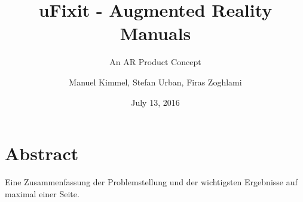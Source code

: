 \documentclass[doctype=Studienarbeit,oneside]{ldvbook}
\begin{document}
\subject{Advanced Seminar}
\title{uFixit - Augmented Reality Manuals}
\subtitle{An AR Product Concept}
\author{Manuel Kimmel, Stefan Urban, Firas Zoghlami}
\date{July 13, 2016}

\maketitle


\chapter*{Abstract}

Eine Zusammenfassung der Problemstellung und der wichtigsten
Ergebnisse auf maximal einer Seite.


\tableofcontents









\end{document}
